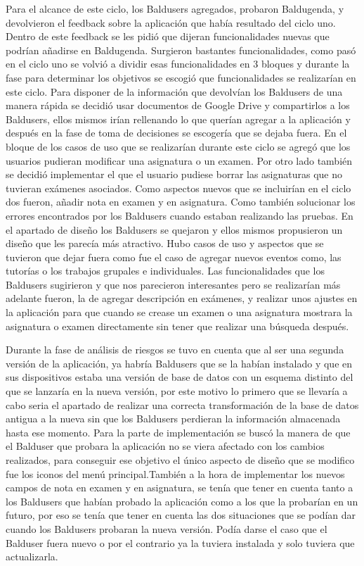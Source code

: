 Para el alcance de este ciclo, los Baldusers agregados, probaron Baldugenda, y devolvieron el feedback sobre la aplicación que había resultado del ciclo uno. Dentro de este feedback se les pidió que dijeran funcionalidades nuevas que podrían añadirse en Baldugenda. Surgieron bastantes funcionalidades, como pasó en el ciclo uno se volvió a dividir esas funcionalidades en 3 bloques y durante la fase para determinar los objetivos se escogió que funcionalidades se realizarían en este ciclo.
Para disponer de la información que devolvían los Baldusers de una manera rápida se decidió usar documentos de Google Drive y compartirlos a los Baldusers, ellos mismos irían rellenando lo que querían agregar a la aplicación y después en la fase de toma de decisiones se escogería que se dejaba fuera.
En el bloque de los casos de uso que se realizarían durante este ciclo se agregó que los usuarios pudieran modificar una asignatura o un examen. Por otro lado también se decidió implementar el que el usuario pudiese borrar las asignaturas que no tuvieran exámenes asociados. Como aspectos nuevos que se incluirían en el ciclo dos fueron, añadir nota en examen y en asignatura. Como también solucionar los errores encontrados por los Baldusers cuando estaban realizando las pruebas. En el apartado de diseño los Baldusers se quejaron y ellos mismos propusieron un diseño que les parecía más atractivo.
Hubo casos de uso y aspectos que se tuvieron que dejar fuera como fue el caso de agregar nuevos eventos como, las tutorías o los trabajos grupales e individuales.
Las funcionalidades que los Baldusers sugirieron y que nos parecieron interesantes pero se realizarían más adelante fueron, la de agregar descripción en exámenes, y realizar unos ajustes en la aplicación para que cuando se crease un examen o una asignatura mostrara la asignatura o examen directamente sin tener que realizar una búsqueda después.

Durante la fase de análisis de riesgos se tuvo en cuenta que al ser una segunda versión de la aplicación, ya habría Baldusers que se la habían instalado y que en sus dispositivos estaba una versión de base de datos con un esquema distinto del que se lanzaría en la nueva versión, por este motivo lo primero que se llevaría a cabo seria el apartado de realizar una correcta transformación de la base de datos antigua a la nueva sin que los Baldusers perdieran la información almacenada hasta ese momento.
Para la parte de implementación se buscó la manera de que el Balduser que probara la aplicación no se viera afectado con los cambios realizados, para conseguir ese objetivo el único aspecto de diseño que se modifico fue los iconos del menú principal.También a la hora de implementar los nuevos campos de nota en examen y en asignatura, se tenía que tener en cuenta tanto a los Baldusers que habían probado la aplicación como a los que la probarían en un futuro, por eso se tenía que tener en cuenta las dos situaciones que se podían dar cuando los Baldusers probaran la nueva versión. Podía darse el caso que el Balduser fuera nuevo o por el contrario ya la tuviera instalada y solo tuviera que actualizarla.

